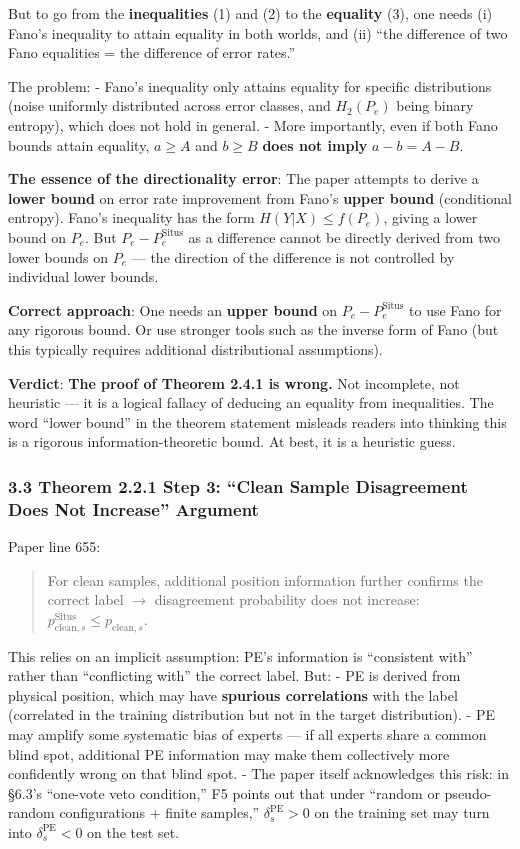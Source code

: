 \documentclass[
  12pt,
]{article}
\begin{document}
But to go from the \textbf{inequalities} (1) and (2) to the \textbf{equality} (3), one needs (i) Fano's inequality to attain equality in both worlds, and (ii) ``the difference of two Fano equalities = the difference of error rates.''

The problem:
- Fano's inequality only attains equality for specific distributions (noise uniformly distributed across error classes, and $H_2(P_e)$ being binary entropy), which does not hold in general.
- More importantly, even if both Fano bounds attain equality, $a \geq A$ and $b \geq B$ \textbf{does not imply} $a-b = A-B$.

\textbf{The essence of the directionality error}: The paper attempts to derive a \textbf{lower bound} on error rate improvement from Fano's \textbf{upper bound} (conditional entropy). Fano's inequality has the form $H(Y|X) \leq f(P_e)$, giving a lower bound on $P_e$. But $P_e - P_e^{\text{Situs}}$ as a difference cannot be directly derived from two lower bounds on $P_e$ --- the direction of the difference is not controlled by individual lower bounds.

\textbf{Correct approach}: One needs an \textbf{upper bound} on $P_e - P_e^{\text{Situs}}$ to use Fano for any rigorous bound. Or use stronger tools such as the inverse form of Fano (but this typically requires additional distributional assumptions).

\textbf{Verdict}: \textbf{The proof of Theorem 2.4.1 is wrong.} Not incomplete, not heuristic --- it is a logical fallacy of deducing an equality from inequalities. The word ``lower bound'' in the theorem statement misleads readers into thinking this is a rigorous information-theoretic bound. At best, it is a heuristic guess.

\subsubsection{3.3 Theorem 2.2.1 Step 3: ``Clean Sample Disagreement Does Not Increase'' Argument}\label{thm-2.2.1-step3}

Paper line 655:
\begin{quote}
For clean samples, additional position information further confirms the correct label $\to$ disagreement probability does not increase: $p_{\text{clean}, s}^{\text{Situs}} \leq p_{\text{clean}, s}$.
\end{quote}

This relies on an implicit assumption: PE's information is ``consistent with'' rather than ``conflicting with'' the correct label. But:
- PE is derived from physical position, which may have \textbf{spurious correlations} with the label (correlated in the training distribution but not in the target distribution).
- PE may amplify some systematic bias of experts --- if all experts share a common blind spot, additional PE information may make them collectively more confidently wrong on that blind spot.
- The paper itself acknowledges this risk: in \S6.3's ``one-vote veto condition,'' F5 points out that under ``random or pseudo-random configurations + finite samples,'' $\delta_s^{\text{PE}} > 0$ on the training set may turn into $\delta_s^{\text{PE}} < 0$ on the test set.
\end{document}
